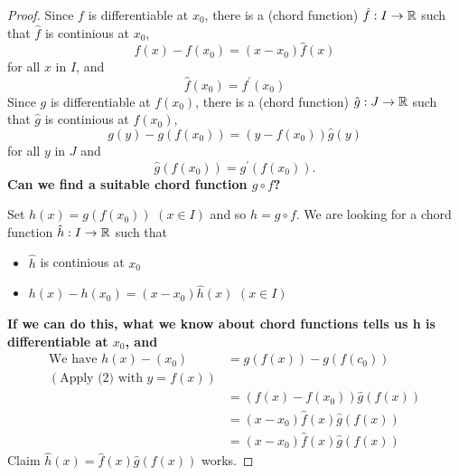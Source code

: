 	\begin{proof}
		Since $f$ is differentiable at $x_0$, there is a (chord function) $\hat{f}:I \to \mathbb{R}$ such that $\hat{f}$ is continious at $x_0$, 
	\begin{equation}
				f\left( x \right)  - f\left( x_0 \right) = (x-x_0) \hat{f}\left( x \right) 
	\end{equation}
		 for all $x$ in $I$, and
		\[
		\hat{f}\left( x_0 \right) = f^{'}\left( x_0 \right) 
		\] 
		Since $g$ is differentiable at $f\left( x_0 \right) $, there is a (chord function) $\hat{g}:J \to \mathbb{R}$ such that $\hat{g}$ is continious at $f\left( x_0 \right) $,
		\begin{equation}
			g\left( y \right) - g\left( f\left( x_0 \right)  \right) = \left( y-f\left( x_0 \right)  \right) \hat{g}\left( y \right) 
		\end{equation} for all $y$ in $J$ and
		\[
			\hat{g}\left( f\left( x_0 \right)  \right) = g^{'}\left( f\left( x_0 \right)  \right) 
		.\] 
		\textbf{Can we find a suitable chord function $g \circ f$?}

		Set $ h\left( x \right) = g\left( f\left( x_0 \right)  \right) $  $\left( x \in I \right) $ and so $h=g \circ f$.
		We are looking for a chord function $\hat{h}:I \to  \mathbb{R}$ such that
		\begin{itemize}
			\item $\hat{h}$ is continious at $x_0$ 
			\item $h\left( x \right) - h\left( x_0 \right) = \left( x-x_0 \right) \hat{h}\left( x \right) $ $\left( x \in  I \right) $
		\end{itemize}
		\textbf{If we can do this, what we know about chord functions tells us h is differentiable at $x_0$, and}
		\begin{align*}	
			\text{We have } h\left( x \right) - \left( x_0 \right) &=g\left( f\left( x \right)  \right) - g\left( f\left( c_0 \right)  \right) \\
			\left( \text{Apply (2) with } y=f\left( x \right)  \right) \\
			&= \left( f\left( x \right) -f\left( x_0 \right)  \right) \hat{g}\left( f\left( x \right)  \right) \\
			&= \left( x-x_0 \right) \hat{f}\left( x \right) \hat{g}\left( f\left( x \right)  \right)\\
			&= \left( x-x_0 \right) \hat{f}\left( x \right) \hat{g}\left( f\left( x \right)  \right) 
		\end{align*}	
		Claim $\hat{h}\left( x \right) = \hat{f}\left( x \right) \hat{g}\left( f\left( x \right) \right) $ works.


\end{proof}
